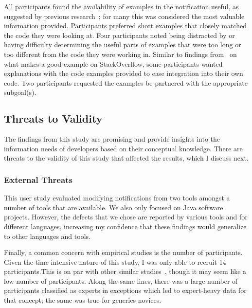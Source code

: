 All participants found the availability of examples in the notification useful, as suggested by previous research~\cite{nasehi2012makes}; for many this was considered the most valuable information provided. 
Participants preferred short examples that closely matched the code they were looking at. 
Four participants noted being distracted by or having difficulty determining the useful parts of examples that were too long or too different from the code they were working in.
Similar to findings from~\cite{nasehi2012makes} on what makes a good example on StackOverflow, some participants wanted explanations with the code examples provided to ease integration into their own code.
Two participants requested the examples be partnered with the appropriate subgoal(s).



\vspace{0.5em}
\vspace{0.5em}

\subsection{Threats to Validity}
The findings from this study are promising and provide insights into the information needs of developers based on their conceptual knowledge. There are threats to the validity of this study that affected the results, which I discuss next.

\subsubsection{External Threats}
This user study evaluated modifying notifications from two tools amongst a number of tools that are available.
We also only focused on Java software projects.
However, the defects that we chose are reported by various tools and for different languages, increasing my confidence that these findings would generalize to other languages and tools.

Finally, a common concern with empirical studies is the number of participants. Given the time-intensive nature of this study, I was only able to recruit 14 participants.This is on par with other similar studies~\cite{smith2015questions,Layman:2007:FaultFix}, though it may seem like a low number of participants. 
Along the same lines, there was a large number of participants classified as experts in exceptions which led to expert-heavy data for that concept; the same was true for generics novices.


